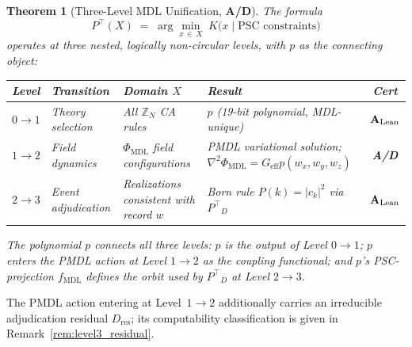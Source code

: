 \documentclass[11pt]{article}
\newtheorem{theorem}{Theorem}[section]
\theoremstyle{remark}
\newcommand{\PHIMDL}{\ensuremath{\Phi_{\mathrm{MDL}}}}
\newcommand{\fmdl}{\ensuremath{f_{\mathrm{MDL}}}}
\newcommand{\Ptop}{\ensuremath{P^{\top}}}
\newcommand{\CatAL}{\ensuremath{\textbf{A}_{\rm Lean}}}
\newcommand{\CatAD}{\textbf{A/D}}
\begin{document}
\begin{theorem}[Three-Level MDL Unification, \CatAD]
\label{thm:three_level}
The formula
\begin{equation}
  \Ptop(X) \;=\; \arg\min_{x \,\in\, X}\; K\!\bigl(x \mid \text{PSC constraints}\bigr)
  \label{eq:mdl_formula}
\end{equation}
operates at three nested, logically non-circular levels, with $p$ as the
connecting object:

\begin{center}
\begin{tabular}{@{}P{1.4cm}P{2.6cm}P{3.0cm}P{3.4cm}c@{}}
\toprule
\textbf{Level} & \textbf{Transition} & \textbf{Domain $X$} & \textbf{Result} & \textbf{Cert} \\
\midrule
$0 \to 1$ & Theory selection
  & All $\mathbb{Z}_N$ CA rules
  & $p$ (19-bit polynomial, MDL-unique)
  & \CatAL \\
$1 \to 2$ & Field dynamics
  & $\PHIMDL$ field configurations
  & PMDL variational solution; $\nabla^2\PHIMDL = G_{\mathrm{eff}} p(w_x,w_y,w_z)$
  & \CatAD \\
$2 \to 3$ & Event adjudication
  & Realizations consistent with record $w$
  & Born rule $P(k) = |c_k|^2$ via $\Ptop_D$
  & \CatAL \\
\bottomrule
\end{tabular}
\end{center}

\noindent
The polynomial $p$ connects all three levels:
$p$ \textit{is} the output of Level $0\to1$;
$p$ \textit{enters} the PMDL action at Level $1\to2$ as the coupling
functional; and $p$'s PSC-projection \fmdl{} \textit{defines} the orbit used
by $\Ptop_D$ at Level $2\to3$.
\end{theorem}

\noindent
The PMDL action entering at Level~$1\to2$ additionally carries an
irreducible adjudication residual $D_{\mathrm{res}}$; its computability
classification is given in Remark~\ref{rem:level3_residual}.
\end{document}
